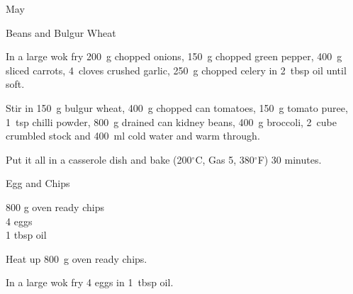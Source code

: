 \begin{menu}{May}
\begin{recipe}{2}{Beans and Bulgur Wheat}
    \begin{instructions}
    \item 
        In a large wok fry
        200~g chopped onions,
        150~g chopped green pepper,
        400~g sliced carrots,
        4~cloves crushed garlic,
        250~g chopped celery
        in
        2~tbsp  oil
        until soft.
      \item 
        Stir in
        150~g  bulgur wheat,
        400~g chopped can tomatoes,
        150~g  tomato puree,
        1~tsp  chilli powder,
        800~g drained can kidney beans,
        400~g  broccoli,
        2~cube crumbled stock
        and
        400~ml  cold water
        and warm through.
      \item 
        Put it all in a casserole dish
        and bake (200$^{\circ}$C, Gas 5, 380$^{\circ}$F) 30 minutes.
      
    \end{instructions}
    \end{recipe}%
  
    \begin{recipe}{1}{Egg and Chips}%
		\begin{ingredients}
		800 g oven ready chips  \\
	4  eggs  \\
	1 tbsp oil  \\
	
		\end{ingredients}
	
	
    \begin{instructions}
    \item 
        Heat up
        800~g  oven ready chips.
      \item 
        In a large wok fry
        4  eggs
        in
        1~tbsp  oil.
      
    \end{instructions}
    \end{recipe}%
  
    \clearpage
    \end{menu}
	

